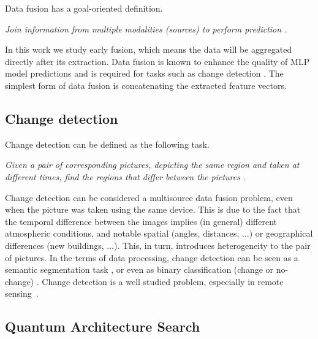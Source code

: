 \documentclass[runningheads]{llncs}
\begin{document}
Data fusion has a goal-oriented definition.
\begin{center}
	\textit{Join information from multiple modalities (sources) to perform prediction \cite{baltrusaitisMultimodalMachineLearning2019}.}
\end{center}
In this work we study early fusion, which means the data will be aggregated directly after its extraction. Data
fusion is known to enhance the quality of MLP model predictions and is required for tasks such as change detection
\cite{QMLCaseStudy}. The simplest form of data fusion is concatenating the extracted feature vectors.


\subsection{Change detection}

Change detection can be defined as the following task.
\begin{center}
	\textit{Given a pair of corresponding pictures, depicting the same region and taken at different times, find the
		regions that differ between the pictures \cite{QMLCaseStudy}. }
\end{center}
Change detection can be considered a multisource data fusion problem, even when the picture was taken using
the same device. This is due to the fact that the temporal difference between the images implies (in general)
different atmospheric conditions, and notable spatial (angles, distances, ...) or geographical differences (new
buildings, ...). This, in turn, introduces heterogeneity to the pair of pictures. In the terms of data processing,
change detection can be seen as a semantic segmentation task \cite{Segmentation}, or even as binary classification
(change or no-change) \cite{QMLCaseStudy}. Change detection is a well studied problem, especially in remote
sensing~\cite{ChangeDetectionSurvey}.


\subsection{Quantum Architecture Search}
\end{document}
